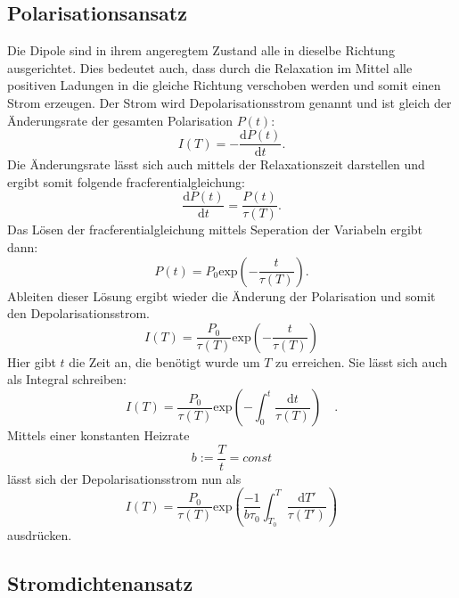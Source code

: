\subsection{Polarisationsansatz}

Die Dipole sind in ihrem angeregtem Zustand alle in dieselbe Richtung ausgerichtet.
Dies bedeutet auch, dass durch die Relaxation im Mittel alle positiven Ladungen in 
die gleiche Richtung verschoben werden und somit einen Strom erzeugen.
Der Strom wird Depolarisationsstrom genannt und ist gleich der Änderungsrate der 
gesamten Polarisation $P(t)$:
\begin{equation}
    I(T) = - \frac{\text{d}P(t)}{\text{d}t}.
\end{equation}
Die Änderungsrate lässt sich auch mittels der Relaxationszeit darstellen und ergibt somit 
folgende fracferentialgleichung:
\begin{equation}
    \frac{\text{d} P(t)}{\text{d} t} = \frac{P(t)}{\tau(T)}.
    \label{eqn:fracf}
\end{equation}
Das Lösen der fracferentialgleichung mittels Seperation der Variabeln ergibt dann:
\begin{equation}
    P(t) = P_0 \text{exp}\left(- \frac{t}{\tau(T)} \right).
\end{equation}
Ableiten dieser Lösung ergibt wieder die Änderung der Polarisation und somit den 
Depolarisationsstrom.
\begin{equation}
    I(T) = \frac{P_0}{\tau(T)} \text{exp}\left(-\frac{t}{\tau(T)}\right)
\end{equation}
Hier gibt $t$ die Zeit an, die benötigt wurde um $T$ zu erreichen.
Sie lässt sich auch als Integral schreiben:
\begin{equation}
    I(T) = \frac{P_0}{\tau(T)} \text{exp}\left(-\int_0^t\frac{\text{d}t}{\tau(T)}\right) \quad.
    \end{equation}
Mittels einer konstanten Heizrate
\begin{equation}
    b := \frac{T}{t} = const
\end{equation}
lässt sich der Depolarisationsstrom nun als 
\begin{equation}
    I(T) = \frac{P_0}{\tau(T)} \text{exp}\left(\frac{-1}{b\tau_0}\int_{T_0}^T\frac{\text{d}T'}{\tau(T')}\right)
\end{equation}
ausdrücken.

\subsection{Stromdichtenansatz}


